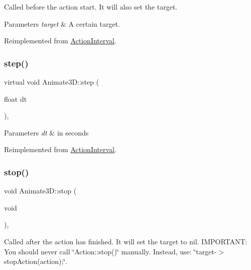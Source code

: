 Called before the action start. It will also set the target.


\begin{DoxyParams}{Parameters}
{\em target} & A certain target. \\
\hline
\end{DoxyParams}


Reimplemented from \hyperlink{classActionInterval_ad3d91186b2c3108488ddbbdbbd982484}{Action\+Interval}.

\mbox{\label{classAnimate3D_a9fed05e5478085f002769b6931a123d4}} 
\subsubsection{\texorpdfstring{step()}{step()}}
{\footnotesize\ttfamily virtual void Animate3\+D\+::step (\begin{DoxyParamCaption}\item[{float}]{dt }\end{DoxyParamCaption})\hspace{0.3cm}{\ttfamily [override]}, {\ttfamily [virtual]}}


\begin{DoxyParams}{Parameters}
{\em dt} & in seconds \\
\hline
\end{DoxyParams}


Reimplemented from \hyperlink{classActionInterval_a9a520f0c4bd2d5b92e7f355bccd6f5cf}{Action\+Interval}.

\mbox{\label{classAnimate3D_a9d27a950ce7942a73a392936951fc263}} 
\subsubsection{\texorpdfstring{stop()}{stop()}\hspace{0.1cm}{\footnotesize\ttfamily [1/2]}}
{\footnotesize\ttfamily void Animate3\+D\+::stop (\begin{DoxyParamCaption}\item[{void}]{ }\end{DoxyParamCaption})\hspace{0.3cm}{\ttfamily [override]}, {\ttfamily [virtual]}}

Called after the action has finished. It will set the \textquotesingle{}target\textquotesingle{} to nil. I\+M\+P\+O\+R\+T\+A\+NT\+: You should never call \char`\"{}\+Action\+::stop()\char`\"{} manually. Instead, use\+: \char`\"{}target-\/$>$stop\+Action(action);\char`\"{}. 

